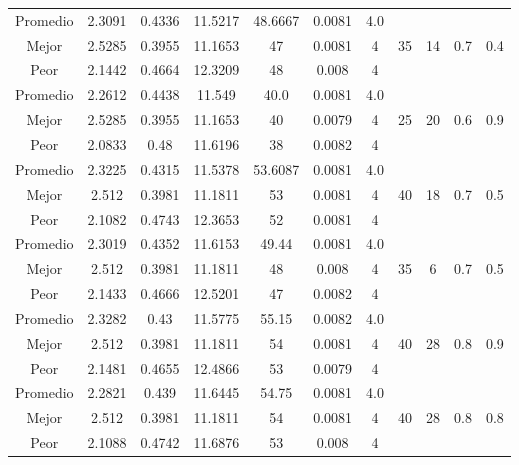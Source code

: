 \begin{table}[h!]
\begin{center}
\begin{tabular}{|c|c|c|c|c|c|c|c|c|c|c|}
        \hline
        \hline
            Promedio  & 2.3091 & 0.4336 & 11.5217 & 48.6667 & 0.0081 & 4.0 &  &  &  & \\
            \cline{1-7}
            Mejor & 2.5285 & 0.3955  & 11.1653 & 47 & 0.0081 & 4 & 35 & 14 & 0.7 & 0.4\\
            \cline{1-7}
            Peor & 2.1442 & 0.4664  & 12.3209 & 48 & 0.008 & 4 &  &  &  & \\
        \hline
        \hline
            Promedio  & 2.2612 & 0.4438 & 11.549 & 40.0 & 0.0081 & 4.0 &  &  &  & \\
            \cline{1-7}
            Mejor & 2.5285 & 0.3955  & 11.1653 & 40 & 0.0079 & 4 & 25 & 20 & 0.6 & 0.9\\
            \cline{1-7}
            Peor & 2.0833 & 0.48  & 11.6196 & 38 & 0.0082 & 4 &  &  &  & \\
        \hline
        \hline
            Promedio  & 2.3225 & 0.4315 & 11.5378 & 53.6087 & 0.0081 & 4.0 &  &  &  & \\
            \cline{1-7}
            Mejor & 2.512 & 0.3981  & 11.1811 & 53 & 0.0081 & 4 & 40 & 18 & 0.7 & 0.5\\
            \cline{1-7}
            Peor & 2.1082 & 0.4743  & 12.3653 & 52 & 0.0081 & 4 &  &  &  & \\
        \hline
        \hline
            Promedio  & 2.3019 & 0.4352 & 11.6153 & 49.44 & 0.0081 & 4.0 &  &  &  & \\
            \cline{1-7}
            Mejor & 2.512 & 0.3981  & 11.1811 & 48 & 0.008 & 4 & 35 & 6 & 0.7 & 0.5\\
            \cline{1-7}
            Peor & 2.1433 & 0.4666  & 12.5201 & 47 & 0.0082 & 4 &  &  &  & \\
        \hline
        \hline
            Promedio  & 2.3282 & 0.43 & 11.5775 & 55.15 & 0.0082 & 4.0 &  &  &  & \\
            \cline{1-7}
            Mejor & 2.512 & 0.3981  & 11.1811 & 54 & 0.0081 & 4 & 40 & 28 & 0.8 & 0.9\\
            \cline{1-7}
            Peor & 2.1481 & 0.4655  & 12.4866 & 53 & 0.0079 & 4 &  &  &  & \\
        \hline
        \hline
            Promedio  & 2.2821 & 0.439 & 11.6445 & 54.75 & 0.0081 & 4.0 &  &  &  & \\
            \cline{1-7}
            Mejor & 2.512 & 0.3981  & 11.1811 & 54 & 0.0081 & 4 & 40 & 28 & 0.8 & 0.8\\
            \cline{1-7}
            Peor & 2.1088 & 0.4742  & 11.6876 & 53 & 0.008 & 4 &  &  &  & \\

\end{tabular}
\end{center}
\end{table}
